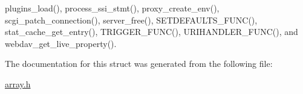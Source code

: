 plugins\-\_\-load(), process\-\_\-ssi\-\_\-stmt(), proxy\-\_\-create\-\_\-env(), scgi\-\_\-patch\-\_\-connection(), server\-\_\-free(), S\-E\-T\-D\-E\-F\-A\-U\-L\-T\-S\-\_\-\-F\-U\-N\-C(), stat\-\_\-cache\-\_\-get\-\_\-entry(), T\-R\-I\-G\-G\-E\-R\-\_\-\-F\-U\-N\-C(), U\-R\-I\-H\-A\-N\-D\-L\-E\-R\-\_\-\-F\-U\-N\-C(), and webdav\-\_\-get\-\_\-live\-\_\-property().



The documentation for this struct was generated from the following file\-:\begin{DoxyCompactItemize}
\item 
\hyperlink{array_8h}{array.\-h}\end{DoxyCompactItemize}
